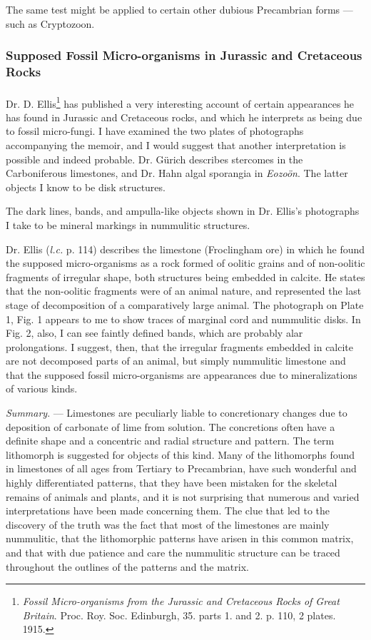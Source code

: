 \documentclass[a4paper, 12pt, oneside]{article}
\begin{document}
The same test might be applied to certain other dubious Precambrian forms --- such as Cryptozoon.

\subsubsection{Supposed Fossil Micro-organisms in Jurassic and Cretaceous Rocks}
\paragraph{}
Dr. D. Ellis\footnote{\emph{Fossil Micro-organisms from the Jurassic and Cretaceous Rocks of Great Britain}. Proc. Roy. Soc. Edinburgh, 35. parts 1. and 2. p. 110, 2 plates. 1915.} has published a very interesting account of certain appearances he has found in Jurassic and Cretaceous rocks, and which he interprets as being due to fossil micro-fungi. I have examined the two plates of photographs accompanying the memoir, and I would suggest that another interpretation is possible and indeed probable. Dr. Gürich describes stercomes in the Carboniferous limestones, and Dr. Hahn algal sporangia in \emph{Eozoön}. The latter objects I know to be disk structures.

The dark lines, bands, and ampulla-like objects shown in Dr. Ellis's photographs I take to be mineral markings in nummulitic structures.

Dr. Ellis (\emph{l.c.} p. 114) describes the limestone (Froclingham ore) in which he found the supposed micro-organisms as a rock formed of oolitic grains and of non-oolitic fragments of irregular shape, both structures being embedded in calcite. He states that the non-oolitic fragments were of an animal nature, and represented the last stage of decomposition of a comparatively large animal. The photograph on Plate 1, Fig. 1 appears to me to show traces of marginal cord and nummulitic disks. In Fig. 2, also, I can see faintly defined bands, which are probably alar prolongations. I suggest, then, that the irregular fragments embedded in calcite are not decomposed parts of an animal, but simply nummulitic limestone and that the supposed fossil micro-organisms are appearances due to mineralizations of various kinds.

\emph{Summary}. --- Limestones are peculiarly liable to concretionary changes due to deposition of carbonate of lime from solution. The concretions often have a definite shape and a concentric and radial structure and pattern. The term lithomorph is suggested for objects of this kind. Many of the lithomorphs found in limestones of all ages from Tertiary to Precambrian, have such wonderful and highly differentiated patterns, that they have been mistaken for the skeletal remains of animals and plants, and it is not surprising that numerous and varied interpretations have been made concerning them. The clue that led to the discovery of the truth was the fact that most of the limestones are mainly nummulitic, that the lithomorphic patterns have arisen in this common matrix, and that with due patience and care the nummulitic structure can be traced throughout the outlines of the patterns and the matrix.
\clearpage
\end{document}
